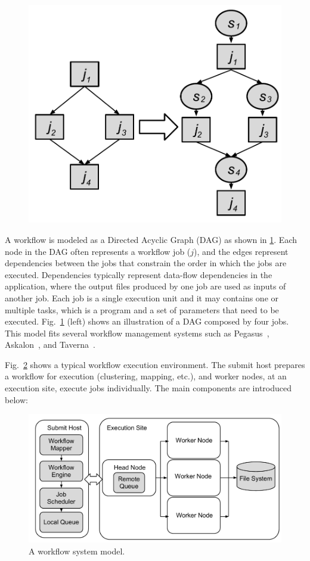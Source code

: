 \documentclass[final,5p,times,twocolumn]{elsarticle}
\begin{document}
\begin{figure}[htb]
	\centering
	\includegraphics[width=0.7\linewidth]{figure/odag.pdf}
	\label{fig:odag}
	\vspace{-10pt}
\end{figure}
A workflow is modeled as a Directed Acyclic Graph (DAG) as shown in \ref{fig:odag}. Each node in the DAG often represents a workflow job ($j$), and the edges represent dependencies between the jobs that constrain the order in which the jobs are executed. Dependencies typically represent data-flow dependencies in the application, where the output files produced by one job are used as inputs of another job. Each job is a single execution unit and it may contains one or multiple tasks, which is a program and a set of parameters that need to be executed. Fig.~\ref{fig:odag} (left) shows an illustration of a DAG composed by four jobs. This model fits several workflow management systems such as Pegasus~\cite{Deelman2005}, Askalon~\cite{Fahringer2005}, and Taverna~\cite{Oinn:2006:TLC:1148437.1148448}.

Fig.~\ref{fig:system} shows a typical workflow execution environment. The submit host prepares a workflow for execution (clustering, mapping, etc.), and worker nodes, at an execution site, execute jobs individually. The main components are introduced below:

\begin{figure}[htb]
\centering
  \includegraphics[width=0.95\linewidth]{figure/execution.pdf}
  \caption{A workflow system model.}
  \label{fig:system}
  \vspace{-10pt}
\end{figure}
\end{document}
